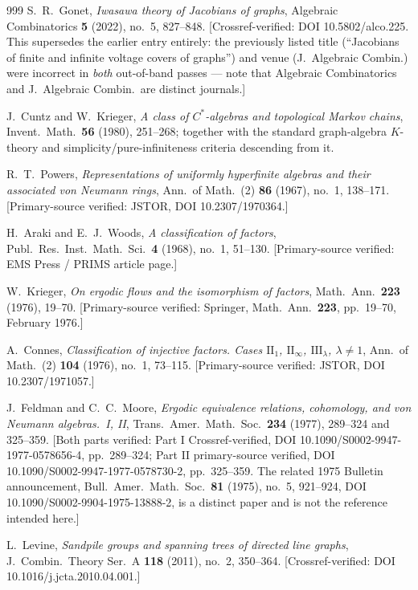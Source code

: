 \begin{thebibliography}{999}
 S.~R.~Gonet, \emph{Iwasawa theory of Jacobians of graphs}, Algebraic Combinatorics \textbf{5} (2022), no.~5, 827--848. [Crossref-verified: DOI 10.5802/alco.225. This supersedes the earlier entry entirely: the previously listed title (``Jacobians of finite and infinite voltage covers of graphs'') and venue (J.\ Algebraic Combin.) were incorrect in \emph{both} out-of-band passes --- note that Algebraic Combinatorics and J.\ Algebraic Combin.\ are distinct journals.]

 J.~Cuntz and W.~Krieger, \emph{A class of $C^*$-algebras and topological Markov chains}, Invent.\ Math.\ \textbf{56} (1980), 251--268; together with the standard graph-algebra $K$-theory and simplicity/pure-infiniteness criteria descending from it.

 R.~T.~Powers, \emph{Representations of uniformly hyperfinite algebras and their associated von Neumann rings}, Ann.\ of Math.\ (2) \textbf{86} (1967), no.~1, 138--171. [Primary-source verified: JSTOR, DOI 10.2307/1970364.]

 H.~Araki and E.~J.~Woods, \emph{A classification of factors}, Publ.\ Res.\ Inst.\ Math.\ Sci.\ \textbf{4} (1968), no.~1, 51--130. [Primary-source verified: EMS Press / PRIMS article page.]

 W.~Krieger, \emph{On ergodic flows and the isomorphism of factors}, Math.\ Ann.\ \textbf{223} (1976), 19--70. [Primary-source verified: Springer, Math.\ Ann.\ \textbf{223}, pp.~19--70, February 1976.]

 A.~Connes, \emph{Classification of injective factors. Cases $\mathrm{II}_1$, $\mathrm{II}_\infty$, $\mathrm{III}_\lambda$, $\lambda\neq1$}, Ann.\ of Math.\ (2) \textbf{104} (1976), no.~1, 73--115. [Primary-source verified: JSTOR, DOI 10.2307/1971057.]

 J.~Feldman and C.~C.~Moore, \emph{Ergodic equivalence relations, cohomology, and von Neumann algebras.\ I, II}, Trans.\ Amer.\ Math.\ Soc.\ \textbf{234} (1977), 289--324 and 325--359. [Both parts verified: Part I Crossref-verified, DOI 10.1090/S0002-9947-1977-0578656-4, pp.~289--324; Part II primary-source verified, DOI 10.1090/S0002-9947-1977-0578730-2, pp.~325--359. The related 1975 Bulletin announcement, Bull.\ Amer.\ Math.\ Soc.\ \textbf{81} (1975), no.~5, 921--924, DOI 10.1090/S0002-9904-1975-13888-2, is a distinct paper and is not the reference intended here.]

 L.~Levine, \emph{Sandpile groups and spanning trees of directed line graphs}, J.\ Combin.\ Theory Ser.\ A \textbf{118} (2011), no.~2, 350--364. [Crossref-verified: DOI 10.1016/j.jcta.2010.04.001.]


\end{thebibliography}
